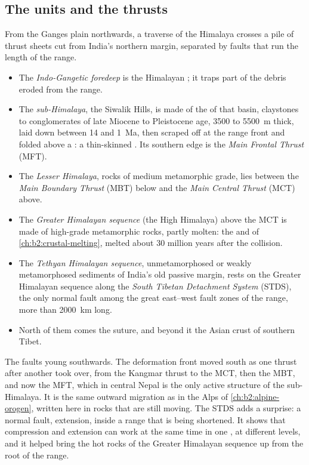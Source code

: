 \subsection{The units and the thrusts}

From the Ganges plain northwards, a traverse of the Himalaya crosses a pile of thrust sheets
cut from India's northern margin, separated by faults that run the length of the range.
\begin{itemize}
\item The \emph{Indo-Gangetic foredeep} is the Himalayan ; it traps part of
the debris eroded from the range.
\item The \emph{sub-Himalaya}, the Siwalik Hills, is made of the  of that basin,
claystones to conglomerates of late Miocene to Pleistocene age, 3500 to \qty{5500}{m} thick,
laid down between 14 and \qty{1}{Ma}, then scraped off at the range front and folded above a
: a thin-skinned . Its southern edge is the \emph{Main Frontal
Thrust} (MFT).
\item The \emph{Lesser Himalaya}, rocks of medium metamorphic grade, lies between the
\emph{Main Boundary Thrust} (MBT) below and the \emph{Main Central Thrust} (MCT) above.
\item The \emph{Greater Himalayan sequence} (the High Himalaya) above the MCT is made of
high-grade metamorphic rocks, partly molten: the  and  of
\cref{ch:b2:crustal-melting}, melted about 30 million years after the collision.
\item The \emph{Tethyan Himalayan sequence}, unmetamorphosed or weakly metamorphosed
sediments of India's old passive margin, rests on the Greater Himalayan sequence along the
\emph{South Tibetan Detachment System} (STDS), the only normal fault among the great
east--west fault zones of the range, more than \qty{2000}{km} long.
\item North of them comes the suture, and beyond it the Asian crust of southern Tibet.
\end{itemize}

The faults young southwards. The deformation front moved south as one thrust after another
took over, from the Kangmar thrust to the MCT, then the MBT, and now the MFT, which in
central Nepal is the only active structure of the sub-Himalaya. It is the same outward
migration as in the Alps of \cref{ch:b2:alpine-orogen}, written here in rocks that are still
moving. The STDS adds a surprise: a normal fault, extension, inside a range that is being
shortened. It shows that compression and extension can work at the same time in one ,
at different levels, and it helped bring the hot rocks of the Greater Himalayan sequence up
from the root of the range.

